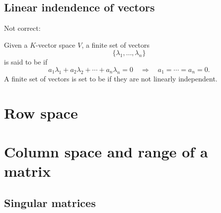 \documentclass{ximera}
\begin{document}
\subsection{Linear indendence of vectors}


Not correct:
\begin{center}
\end{center}




\begin{definition}
  Given a $K$-vector space $V$, a finite set of vectors
  \[
  \{\lambda_1,\dots,\lambda_n\}
  \]
  is said to be  if
  \[
  a_1\lambda_1 + a_2\lambda_2 +\cdots + a_n\lambda_n = 0\quad \Rightarrow \quad a_1= \cdots =a_n = 0.
  \]
  A finite set of vectors is set to be  if
  they are not linearly independent.
\end{definition}



\section{Row space}

\section{Column space and range of a matrix}

\subsection{Singular matrices}
\end{document}
